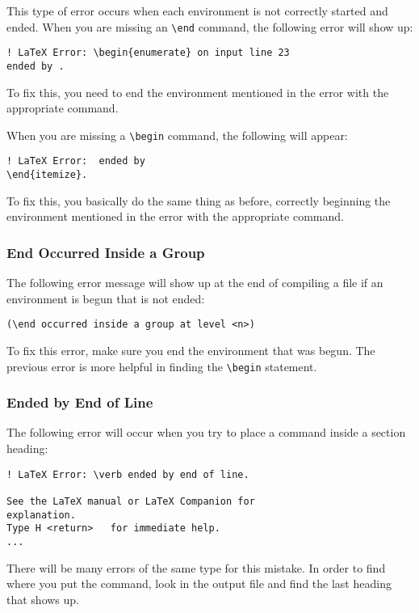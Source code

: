 This type of error occurs when each environment is not correctly
started and ended.  When you are missing an \verb|\end| command, the
following error will show up:
\begin{verbatim}
! LaTeX Error: \begin{enumerate} on input line 23
ended by .
\end{verbatim}

To fix this, you need to end the environment mentioned in the error
with the appropriate command.

When you are missing a \verb|\begin| command, the following will appear:
\begin{verbatim}
! LaTeX Error:  ended by
\end{itemize}.
\end{verbatim}

To fix this, you basically do the same thing as before, correctly
beginning the environment mentioned in the error with the appropriate
command.

\subsubsection{End Occurred Inside a Group}
\label{sec:end-occurred-inside}

The following error message will show up at the end of compiling a
file if an environment is begun that is not ended:
\begin{verbatim}
(\end occurred inside a group at level <n>)
\end{verbatim}

To fix this error, make sure you end the environment that was begun.
The previous error is more helpful in finding the \verb|\begin|
statement.

\subsubsection{Ended by End of Line}
\label{sec:ended-end-line}

The following error will occur when you try to place a command inside
a section heading:
\begin{verbatim}
! LaTeX Error: \verb ended by end of line.

See the LaTeX manual or LaTeX Companion for
explanation.
Type H <return>   for immediate help.
...
\end{verbatim}

There will be many errors of the same type for this mistake.  In order
to find where you put the command, look in the output file and find
the last heading that shows up.

